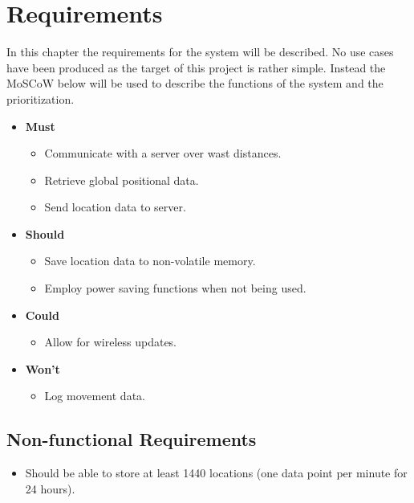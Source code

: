
\chapter{Requirements}
\label{chap:requirements}
In this chapter the requirements for the system will be described.
No use cases have been produced as the target of this project is rather simple.
Instead the MoSCoW below will be used to describe the functions of the system and the prioritization.

\begin{itemize}
	\item \textbf{Must}
	\begin{itemize}
		\item Communicate with a server over wast distances.
		\item Retrieve global positional data.
		\item Send location data to server.
	\end{itemize}
	\item \textbf{Should}
	\begin{itemize}
		\item Save location data to non-volatile memory.
		\item Employ power saving functions when not being used.
	\end{itemize}
	\item \textbf{Could}
	\begin{itemize}
		\item Allow for wireless updates.
	\end{itemize}
	\item \textbf{Won't}
	\begin{itemize}
		\item Log movement data.
	\end{itemize}
\end{itemize}

\section{Non-functional Requirements}
\begin{itemize}
	\item Should be able to store at least \num{1440} locations (one data point per minute for \num{24} hours).
\end{itemize}